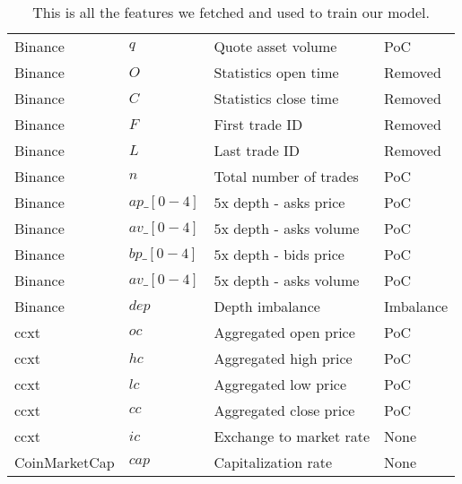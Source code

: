 \begin{table}
\begin{tabular}{|l|l|l|l|}
            Binance         & $q$           & Quote asset volume            & PoC       \\
            Binance         & $O$           & Statistics open time          & Removed   \\
            Binance         & $C$           & Statistics close time         & Removed   \\
            Binance         & $F$           & First trade ID                & Removed   \\
            Binance         & $L$           & Last trade ID                 & Removed   \\
            Binance         & $n$           & Total number of trades        & PoC       \\
            Binance         & $ap\_[0-4]$   & $5$x depth - asks price       & PoC       \\
            Binance         & $av\_[0-4]$   & $5$x depth - asks volume      & PoC       \\
            Binance         & $bp\_[0-4]$   & $5$x depth - bids price       & PoC       \\
            Binance         & $av\_[0-4]$   & $5$x depth - asks volume      & PoC       \\
            Binance         & $dep$         & Depth imbalance               & Imbalance \\
            ccxt            & $oc$          & Aggregated open price         & PoC       \\
            ccxt            & $hc$          & Aggregated high price         & PoC       \\
            ccxt            & $lc$          & Aggregated low price          & PoC       \\
            ccxt            & $cc$          & Aggregated close price        & PoC       \\
            ccxt            & $ic$          & Exchange to market rate       & None      \\
            CoinMarketCap   & $cap$         & Capitalization rate           & None      \\
    \hline
    \end{tabular}
    \caption[Features used]{This is all the features we fetched and used to train our model.}
    \label{tab:feature_table}
\end{table}
